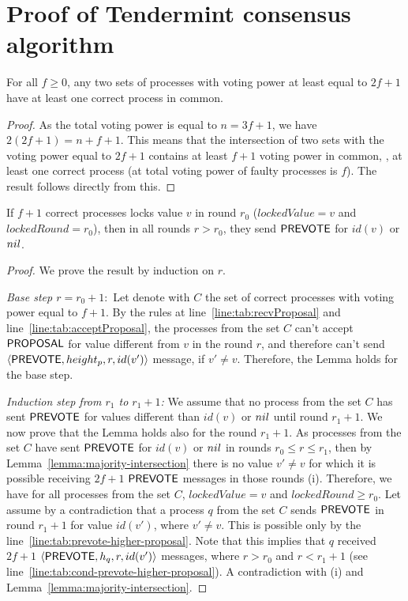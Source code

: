 \section{Proof of Tendermint consensus algorithm}
\label{sec:proof}

\begin{lemma}
	\label{lemma:majority-intersection}
	For all $f\geq 0$, any two sets of processes with voting power at least equal to $2f+1$ have
	at least one correct process in common.
\end{lemma}

\begin{proof}
	As the total voting power is equal to $n=3f+1$, we have $2(2f+1) = n+f+1$.
	This means that the intersection of two sets with the voting power equal to $2f+1$ contains at least $f+1$ voting power in common, \ie, at least one correct process (at total voting power of faulty processes is $f$). The result follows directly from this.
\end{proof}

\begin{lemma}
	\label{lemma:locked-decision_value-prevote-v}
	If $f+1$ correct processes locks value $v$ in round $r_0$ ($lockedValue = v$ and $lockedRound = r_0$), then in all rounds $r > r_0$, they send $\mathsf{PREVOTE}$ for $id(v)$ or $nil$.
\end{lemma}

\begin{proof}
We prove the result by induction on $r$.

\emph{Base step $r = r_0 + 1:$} Let denote with $C$ the set of correct processes with voting power equal to $f+1$. 
By the rules at line~\ref{line:tab:recvProposal} and line~\ref{line:tab:acceptProposal}, the processes from the set $C$ can't accept $\mathsf{PROPOSAL}$ for value different from $v$ in the round $r$, and therefore can't send $\langle\mathsf{PREVOTE},height_p, r,id(v')\rangle$ message,
if $v' \neq v$. Therefore, the Lemma holds for the base step.

\emph{Induction step from $r_1$ to $r_1+1$:} We assume that no process from the set $C$ has sent $\mathsf{PREVOTE}$ for values different than $id(v)$ or $nil$ until round $r_1 + 1$. We now prove that 
the Lemma holds also for the round $r_1 + 1$. As processes from the set $C$ have sent $\mathsf{PREVOTE}$ for $id(v)$ or $nil$ in rounds $r_0 \le r \le r_1$, then by Lemma~\ref{lemma:majority-intersection}
there is no value $v' \neq v$ for which it is possible receiving $2f+1$ $\mathsf{PREVOTE}$ messages in those rounds (i). Therefore, we have for all processes from the set $C$, $lockedValue = v$ and $lockedRound \ge r_0$.   
Let assume by a contradiction that a process $q$ from the set $C$ sends $\mathsf{PREVOTE}$ in round $r_1 + 1$ for value $id(v')$, where $v' \neq v$. This is possible only by the line~\ref{line:tab:prevote-higher-proposal}. 
Note that this implies that $q$ received $2f+1$ $\langle\mathsf{PREVOTE},h_q, r,id(v')\rangle$ messages, where $r > r_0$ and $r < r_1 +1$ (see line~\ref{line:tab:cond-prevote-higher-proposal}). A contradiction with (i) and Lemma~\ref{lemma:majority-intersection}.  	
\end{proof}	

